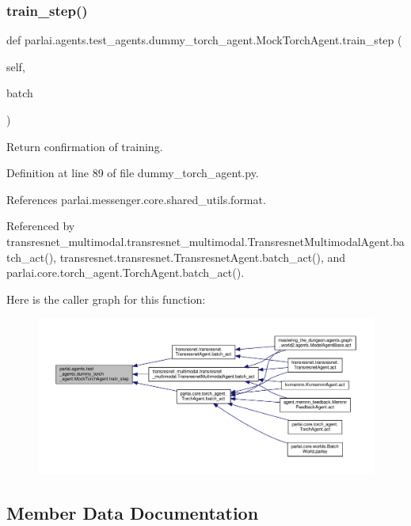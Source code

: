 \subsubsection{\texorpdfstring{train\+\_\+step()}{train\_step()}}
{\footnotesize\ttfamily def parlai.\+agents.\+test\+\_\+agents.\+dummy\+\_\+torch\+\_\+agent.\+Mock\+Torch\+Agent.\+train\+\_\+step (\begin{DoxyParamCaption}\item[{}]{self,  }\item[{}]{batch }\end{DoxyParamCaption})}

\begin{DoxyVerb}Return confirmation of training.\end{DoxyVerb}
 

Definition at line 89 of file dummy\+\_\+torch\+\_\+agent.\+py.



References parlai.\+messenger.\+core.\+shared\+\_\+utils.\+format.



Referenced by transresnet\+\_\+multimodal.\+transresnet\+\_\+multimodal.\+Transresnet\+Multimodal\+Agent.\+batch\+\_\+act(), transresnet.\+transresnet.\+Transresnet\+Agent.\+batch\+\_\+act(), and parlai.\+core.\+torch\+\_\+agent.\+Torch\+Agent.\+batch\+\_\+act().

Here is the caller graph for this function\+:
\nopagebreak
\begin{figure}[H]
\begin{center}
\leavevmode
\includegraphics[width=350pt]{classparlai_1_1agents_1_1test__agents_1_1dummy__torch__agent_1_1MockTorchAgent_a867115faed3455518fb1f9a0ab41f761_icgraph}
\end{center}
\end{figure}


\subsection{Member Data Documentation}
\mbox{\label{classparlai_1_1agents_1_1test__agents_1_1dummy__torch__agent_1_1MockTorchAgent_a229d18c3a8eb8512c29feca34fed43b7}} 
